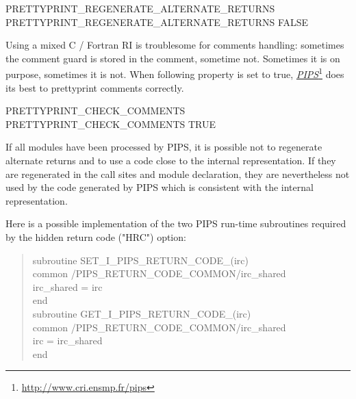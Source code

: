 \documentclass[a4paper]{report}
\newcommand{\PipsPropRef}[1]{\texttt{\detokenize{#1}}~\ref{prop:#1}}
\newcommand{\LINK}[2]{\href{#2}{#1}\footnote{\url{#2}}\xspace}
\newcommand{\PIPS}{\LINK{\emph{PIPS}}{http://www.cri.ensmp.fr/pips}}
\begin{document}
\begin{PipsProp}{PRETTYPRINT_REGENERATE_ALTERNATE_RETURNS}
PRETTYPRINT_REGENERATE_ALTERNATE_RETURNS FALSE
\end{PipsProp}

Using a mixed C / Fortran RI is troublesome for comments handling:
sometimes the comment guard is stored in the comment, sometime not.
Sometimes it is on purpose, sometimes it is not.
When following property is set to true, \PIPS does its best to prettyprint comments correctly.
\begin{PipsProp}{PRETTYPRINT_CHECK_COMMENTS}
PRETTYPRINT_CHECK_COMMENTS TRUE
\end{PipsProp}

%

If all modules have been processed by PIPS, it is possible not to
regenerate alternate returns and to use a code close to the internal
representation. If they are regenerated in the call sites and module
declaration, they are nevertheless not used by the code generated by PIPS
which is consistent with the internal representation.

Here is a possible implementation of the two PIPS run-time subroutines
required by the hidden return code ("HRC") option:

\begin{quote}
      subroutine SET\_I\_PIPS\_RETURN\_CODE\_(irc)\\
      common /PIPS\_RETURN\_CODE\_COMMON/irc\_shared\\
      irc\_shared = irc\\
      end\\
      subroutine GET\_I\_PIPS\_RETURN\_CODE\_(irc)\\
      common /PIPS\_RETURN\_CODE\_COMMON/irc\_shared\\
      irc = irc\_shared\\
      end
\end{quote}
\end{document}
